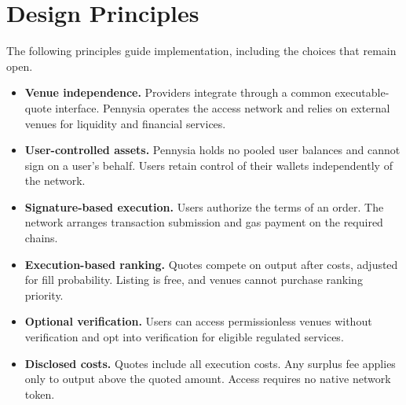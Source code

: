 \section{Design Principles}\label{sec:principles}

The following principles guide implementation, including the choices that remain open.

\begin{itemize}[leftmargin=1.5em]
  \item \textbf{Venue independence.} Providers integrate through a common executable-quote interface. Pennysia operates the access network and relies on external venues for liquidity and financial services.

  \item \textbf{User-controlled assets.} Pennysia holds no pooled user balances and cannot sign on a user's behalf. Users retain control of their wallets independently of the network.

  \item \textbf{Signature-based execution.} Users authorize the terms of an order. The network arranges transaction submission and gas payment on the required chains.

  \item \textbf{Execution-based ranking.} Quotes compete on output after costs, adjusted for fill probability. Listing is free, and venues cannot purchase ranking priority.

  \item \textbf{Optional verification.} Users can access permissionless venues without verification and opt into verification for eligible regulated services.

  \item \textbf{Disclosed costs.} Quotes include all execution costs. Any surplus fee applies only to output above the quoted amount. Access requires no native network token.
\end{itemize}
